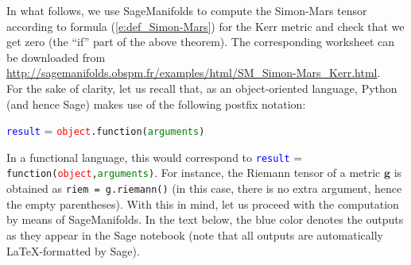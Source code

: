 \documentclass[a4paper]{jpconf}
\newcommand{\soft}[1]{\textsf{#1}}
\newcommand{\Sage}{\soft{Sage}}
\newcommand{\SM}{\soft{SageManifolds}}
\newcommand{\w}[1]{\bm{#1}}
\begin{document}
In what follows, we use \SM{} to compute the Simon-Mars tensor 
according to formula (\ref{e:def_Simon-Mars}) for the Kerr metric and check 
that we get zero (the ``if'' part of the above theorem). 
The corresponding worksheet can be downloaded from \\
\url{http://sagemanifolds.obspm.fr/examples/html/SM_Simon-Mars_Kerr.html}.\\
For the sake of clarity, let us recall that, 
as an object-oriented language, Python (and hence \Sage{}) makes use of 
the following postfix notation:
\begin{center}
\textcolor{blue}{\texttt{result}} = \textcolor{red}{\texttt{object}}\texttt{.}\texttt{function(}\textcolor{green}{\texttt{arguments}}\texttt{)}
\end{center}
In a functional language, this would correspond to 
\textcolor{blue}{\texttt{result}} = \texttt{function(}\textcolor{red}{\texttt{object}}\texttt{,}\textcolor{green}{\texttt{arguments}}\texttt{)}.
For instance, the Riemann tensor of a metric $\w{g}$ is obtained as 
\verb+riem = g.riemann()+
(in this case, there is no extra argument, hence the empty parentheses). 
With this in mind, let us proceed with the computation by means of 
\SM{}. In the text below, the blue color denotes the outputs as they appear in
the \Sage{} notebook (note that all outputs are automatically
\LaTeX{}-formatted by \Sage).
\end{document}
